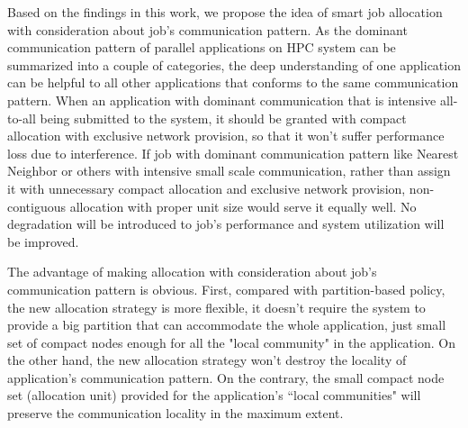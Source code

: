 \documentclass[conference]{IEEEtran}
\begin{document}
Based on the findings in this work, we propose the idea of smart job allocation with consideration about job's communication pattern. As the dominant communication pattern of parallel applications on HPC system can be summarized into a couple of categories, the deep understanding of one application can be helpful to all other applications that conforms to the same communication pattern. When an application with dominant communication that is intensive all-to-all being submitted to the system, it should be granted with compact allocation with exclusive network provision, so that it won't suffer performance loss due to interference. If job with dominant communication pattern like Nearest Neighbor or others with intensive small scale communication, rather than assign it with unnecessary compact allocation and exclusive network provision, non-contiguous allocation with proper unit size would serve it equally well. No degradation will be introduced to job's performance and system utilization will be improved. 

The advantage of making allocation with consideration about job's communication pattern is obvious. First, compared with partition-based policy, the new allocation strategy is more flexible, it doesn't require the system to provide a big partition that can accommodate the whole application, just small set of compact nodes enough for all the "local community" in the application. On the other hand, the new allocation strategy won't destroy the locality of application's communication pattern. On the contrary, the small compact node set (allocation unit) provided for the application's  ``local communities"  will preserve the communication locality in the maximum extent.


%
%
\end{document}
